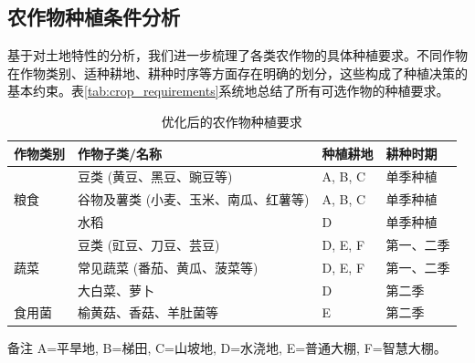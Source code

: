 \subsection{农作物种植条件分析}

基于对土地特性的分析，我们进一步梳理了各类农作物的具体种植要求。不同作物在作物类别、适种耕地、耕种时序等方面存在明确的划分，这些构成了种植决策的基本约束。表\ref{tab:crop_requirements}系统地总结了所有可选作物的种植要求。

\begin{table}[htbp]
    \centering
    \begin{threeparttable}
        \caption{优化后的农作物种植要求}
        \label{tab:crop_requirements_optimized_1}
        \begin{tabularx}{\columnwidth}{l l >{\raggedright\arraybackslash}X l}
            \toprule
            作物类别 & 作物子类/名称 & 种植耕地 & 耕种时期 \\
            \midrule
            \multirow{3}{*}{粮食}
            & 豆类 (黄豆、黑豆、豌豆等) & A, B, C & 单季种植 \\
            \addlinespace %
            & 谷物及薯类 (小麦、玉米、南瓜、红薯等) & A, B, C & 单季种植 \\
            \addlinespace
            & 水稻 & D & 单季种植 \\
            \midrule
            \multirow{3}{*}{蔬菜}
            & 豆类 (豇豆、刀豆、芸豆) & D, E, F & 第一、二季 \\
            \addlinespace
            & 常见蔬菜 (番茄、黄瓜、菠菜等) & D, E, F & 第一、二季 \\
            \addlinespace
            & 大白菜、萝卜 & D & 第二季 \\
            \midrule
            食用菌 & 榆黄菇、香菇、羊肚菌等 & E & 第二季 \\
            \bottomrule
        \end{tabularx}
        \begin{tablenotes}[flushleft]
            \footnotesize %
            \item[备注] A=平旱地, B=梯田, C=山坡地, D=水浇地, E=普通大棚, F=智慧大棚。
        \end{tablenotes}
    \end{threeparttable}
\end{table}


